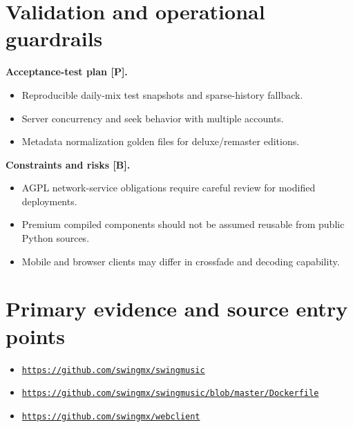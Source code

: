 \documentclass[10pt,a4paper,oneside]{report}
\newcommand{\sourceurl}[1]{\href{#1}{\texttt{\nolinkurl{#1}}}}
\begin{document}
\section{Validation and operational guardrails}
\textbf{Acceptance-test plan [P].}\par
\begin{itemize}[leftmargin=*,itemsep=2pt,topsep=3pt]
\item Reproducible daily-mix test snapshots and sparse-history fallback.
\item Server concurrency and seek behavior with multiple accounts.
\item Metadata normalization golden files for deluxe/remaster editions.
\end{itemize}
\textbf{Constraints and risks [B].}\par
\begin{itemize}[leftmargin=*,itemsep=2pt,topsep=3pt]
\item AGPL network-service obligations require careful review for modified deployments.
\item Premium compiled components should not be assumed reusable from public Python sources.
\item Mobile and browser clients may differ in crossfade and decoding capability.
\end{itemize}
\section*{Primary evidence and source entry points}
\begin{itemize}[leftmargin=*,itemsep=1pt,topsep=1pt]
\item \sourceurl{https://github.com/swingmx/swingmusic}
\item \sourceurl{https://github.com/swingmx/swingmusic/blob/master/Dockerfile}
\item \sourceurl{https://github.com/swingmx/webclient}
\end{itemize}
\clearpage
\end{document}
